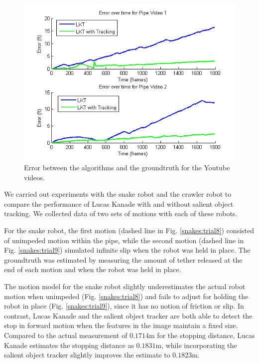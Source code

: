 \documentclass[letterpaper, 10 pt, conference]{ieeeconf}
\begin{document}

\begin{figure}[tb]
	\centering
	\includegraphics[width=\columnwidth]{youtube_err_v_time.png}
	\caption{Error between the algorithms and the groundtruth for the Youtube videos.}
    \label{youtube:error_over_time}
\end{figure}


We carried out experiments with the snake robot and the crawler robot to compare the performance of Lucas Kanade with and without salient object tracking. We collected data of two sets of motions with each of these robots.

For the snake robot, the first motion (dashed line in Fig. \ref{snakes:trial8}) consisted of unimpeded motion within the pipe, while the second motion (dashed line in Fig. \ref{snakes:trial9}) simulated infinite slip when the robot was held in place. The groundtruth was estimated by measuring the amount of tether released at the end of each motion and when the robot was held in place.

The motion model for the snake robot slightly underestimates the actual robot motion when unimpeded (Fig. \ref{snakes:trial8}) and fails to adjust for holding the robot in place (Fig. \ref{snakes:trial9}), since it has no notion of friction or slip. In contrast, Lucas Kanade and the salient object tracker are both able to detect the stop in forward motion when the features in the image maintain a fixed size. Compared to the actual measurement of  $0.1714$m for the stopping distance, Lucas Kanade estimates the stopping distance as $0.1831$m, while incorporating the salient object tracker slightly improves the estimate to $0.1823$m. 
\end{document}
